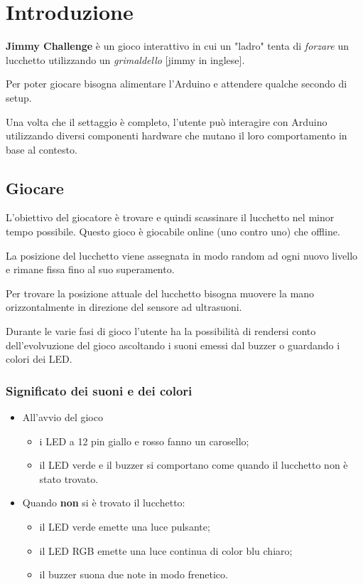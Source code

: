 \chapter{Introduzione}

\textbf{Jimmy Challenge} è un gioco interattivo in cui un "ladro" tenta di \textit{forzare} un lucchetto utilizzando un \textit{grimaldello} [jimmy in inglese]. 

Per poter giocare bisogna alimentare l'Arduino e attendere qualche secondo di setup.

Una volta che il settaggio è completo, l'utente può interagire con Arduino utilizzando diversi componenti hardware che mutano il loro comportamento in base al contesto.

\section{Giocare}
L'obiettivo del giocatore è trovare e quindi scassinare il lucchetto nel minor tempo possibile. Questo gioco è giocabile online (uno contro uno) che offline.

La posizione del lucchetto viene assegnata in modo random ad ogni nuovo livello e rimane fissa fino al suo superamento.

Per trovare la posizione attuale del lucchetto bisogna muovere la mano orizzontalmente in direzione del sensore ad ultrasuoni.

Durante le varie fasi di gioco l'utente ha la possibilità di rendersi conto dell'evolvuzione del gioco ascoltando i suoni emessi dal buzzer o guardando i colori dei LED.

\subsection{Significato dei suoni e dei colori}
\begin{itemize}
	\item All'avvio del gioco
	\begin{itemize}
		\item i LED a 12 pin giallo e rosso fanno un carosello;
		\item il LED verde e il buzzer si comportano come quando il lucchetto non è stato trovato.
	\end{itemize}
\end{itemize}


\begin{itemize}
	\item Quando \textbf{non} si è trovato il lucchetto:
	\begin{itemize}
		\item il LED verde emette una luce pulsante;
		\item il LED RGB emette una luce continua di color blu chiaro;
		\item il buzzer suona due note in modo frenetico.
	\end{itemize}
\end{itemize}

